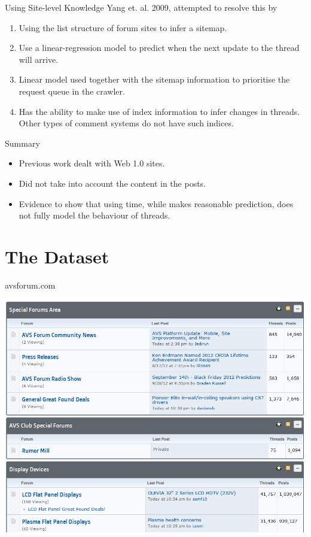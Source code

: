 \documentclass[12pt]{../presentation}
\begin{document}
\begin{frame}{Using Site-level Knowledge}
Yang et. al. 2009, attempted to resolve this by
	\begin{enumerate}
		\item Using the list structure of forum sites to infer a sitemap.
		\item Use a linear-regression model to predict when the next update to the thread will arrive. %
		\item Linear model used together with the sitemap information to prioritise the request queue in the crawler.
		\item Has the ability to make use of index information to infer changes in threads. Other types of comment systems do not have such indices.
	\end{enumerate}
\end{frame}

\begin{frame}{Summary}
	\begin{itemize}
		\item Previous work dealt with Web 1.0 sites.
		\item Did not take into account the content in the posts.
		\item Evidence to show that using time, while makes reasonable prediction, does not fully model the behaviour of threads.
	\end{itemize}
\end{frame}

\section{The Dataset}
\begin{frame}{avsforum.com}
	\begin{center}
		\includegraphics[scale=0.3]{screenshots/index.png}
	\end{center}
\end{frame}
\end{document}
